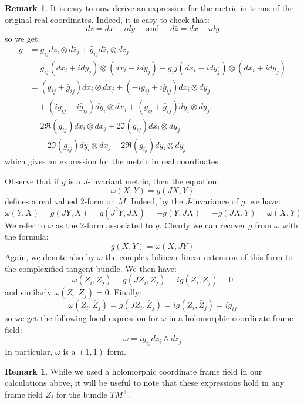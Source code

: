 \documentclass[11pt]{amsart}
\theoremstyle{definition}
\newtheorem{remark}[subsection]{Remark}
\begin{document}
\begin{remark}  It is easy to now derive an expression for the metric in terms of the original real coordinates.  Indeed, it is easy to check that:
%
$$ d z = dx + i dy \quad \text{ and } \quad d \bar{z} = dx - i dy $$
%
so we get:
%
\begin{align*}
g &= g_{ij} dz_i \otimes d \bar{z}_j + \bar{g}_{ij} d \bar{z}_i \otimes d z_j \\
&= g_{ij} ( dx_i + i dy_j ) \otimes ( d x_i - i d y_j ) + \bar{g}_ij (  d x_i - i d y_j  ) \otimes ( dx_i + i dy_j ) \\
%
&= ( g_{ij} + \bar{g}_{ij} ) dx_i \otimes dx_j + ( - i g_{ij} + i \bar{g}_{ij} ) dx_i \otimes dy_j \\
& \quad + ( i g_{ij} - i \bar{g}_{ij} ) dy_i \otimes dx_j + ( g_{ij} + \bar{g}_{ij} ) dy_i \otimes dy_j \\
%
&= 2 \Re (g_{ij}) dx_i \otimes dx_j + 2 \Im( g_{ij} ) dx_i \otimes dy_j \\
& \quad - 2 \Im( g_{ij} ) dy_i \otimes dx_j + 2 \Re ( g_{ij} ) dy_i \otimes dy_j
\end{align*}
%
which gives an expression for the metric in real coordinates.
\end{remark}

Observe that if $g$ is a $J$-invariant metric, then the equation:
%
$$\omega(X,Y) = g(JX, Y)$$
%
defines a real valued 2-form on $M$. Indeed, by the $J$-invariance of $g$, we have:
%
$$ \omega(Y,X) = g(JY, X) = g( J^2 Y, JX ) = - g( Y, JX ) = - g( JX, Y ) = \omega( X, Y ) $$
%
We refer to $\omega$ as the 2-form associated to $g$.  Clearly we can recover $g$ from $\omega$ with the formula:
%
$$ g(X,Y) = \omega(X,JY) $$
%
Again, we denote also by $\omega$ the complex bilinear linear extension of this form to the complexified tangent bundle.  We then have:
%
$$ \omega( Z_i, Z_j ) = g( J Z_i, Z_j ) = i g( Z_i, Z_j ) = 0 $$
%
and similarly $ \omega( \bar{Z}_i, \bar{Z}_j ) = 0 $.  Finally:
%
$$ \omega( Z_i, \bar{Z}_j ) = g( J Z_i, \bar{Z}_j ) = i g( Z_i, \bar{Z}_j ) = i g_{ij} $$
%
so we get the following local expression for $\omega$ in a holomorphic coordinate frame field:
%
$$ \omega = i g_{ij} d z_i \wedge d \bar{z}_j $$
%
In particular, $\omega$ is a $(1,1)$ form.

\begin{remark}
While we used a holomorphic coordinate frame field in our calculations above, it will be useful to note that these expressions hold in any frame field $Z_i$ for the bundle $TM^{+}$.
\end{remark}
\end{document}
